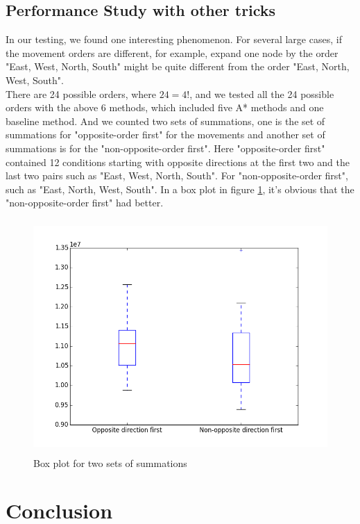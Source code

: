 \documentclass[11pt,letter]{article}
\begin{document}
\subsection {Performance Study with other tricks}
In our testing, we found one interesting phenomenon. For several large cases, if the movement orders are different, for example, expand one node by the order "East, West, North, South" might be quite different from the order "East, North, West, South". \\
There are 24 possible orders, where $24 = 4!$, and we tested all the 24 possible orders with the above 6 methods, which included five A* methods and one baseline method. And we counted two sets of summations, one is the set of summations for "opposite-order first" for the movements and another set of summations is for the "non-opposite-order first". Here "opposite-order first" contained 12 conditions starting with opposite directions at the first two and the last two pairs such as "East, West, North, South". For "non-opposite-order first", such as "East, North, West, South". In a box plot in figure \ref{fig_boxplot}, it's obvious that the "non-opposite-order first" had better.
\begin{figure} [h!]
\centering
\includegraphics[height=3.5in, width=4.5in]{figs/boxplot.png}
\caption{Box plot for two sets of summations}
\label{fig_boxplot}
\end{figure}

\section {Conclusion}
\end{document}
